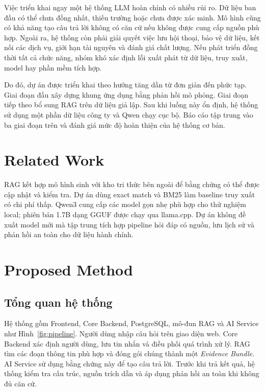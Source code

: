 \documentclass[runningheads]{llncs}
\begin{document}
Việc triển khai ngay một hệ thống LLM hoàn chỉnh có nhiều rủi ro. Dữ liệu ban đầu
có thể chưa đồng nhất, thiếu trường hoặc chưa được xác minh. Mô hình cũng có khả
năng tạo câu trả lời không có căn cứ nếu không được cung cấp nguồn phù hợp. Ngoài
ra, hệ thống còn phải giải quyết việc lưu hội thoại, bảo vệ dữ liệu, kết nối các
dịch vụ, giới hạn tài nguyên và đánh giá chất lượng. Nếu phát triển đồng thời tất
cả chức năng, nhóm khó xác định lỗi xuất phát từ dữ liệu, truy xuất, model hay
phần mềm tích hợp.

Do đó, dự án được triển khai theo hướng tăng dần từ đơn giản đến phức tạp. Giai
đoạn đầu xây dựng khung ứng dụng bằng phản hồi mô phỏng. Giai đoạn tiếp theo bổ
sung RAG trên dữ liệu giả lập. Sau khi luồng này ổn định, hệ thống sử dụng một
phần dữ liệu công ty và Qwen chạy cục bộ. Báo cáo tập trung vào ba giai đoạn trên
và đánh giá mức độ hoàn thiện của hệ thống cơ bản.

\section{Related Work}

RAG kết hợp mô hình sinh với kho tri thức bên ngoài để bằng chứng có thể được cập
nhật và kiểm tra. Dự án dùng exact match và BM25 làm baseline truy xuất có chi
phí thấp. Qwen3 cung cấp các model gọn nhẹ phù hợp cho thử nghiệm local; phiên
bản 1.7B dạng GGUF được chạy qua llama.cpp. Dự án không
đề xuất model mới mà tập trung tích hợp pipeline hỏi đáp có nguồn, lưu lịch sử và
phản hồi an toàn cho dữ liệu hành chính.

\section{Proposed Method}

\subsection{Tổng quan hệ thống}

Hệ thống gồm Frontend, Core Backend, PostgreSQL, mô-đun RAG và AI Service như
Hình~\ref{fig:pipeline}. Người dùng nhập câu hỏi trên giao diện web. Core Backend
xác định người dùng, lưu tin nhắn và điều phối quá trình xử lý. RAG tìm các đoạn
thông tin phù hợp và đóng gói chúng thành một \textit{Evidence Bundle}. AI Service
sử dụng bằng chứng này để tạo câu trả lời. Trước khi trả kết quả, hệ thống kiểm
tra cấu trúc, nguồn trích dẫn và áp dụng phản hồi an toàn khi không đủ căn cứ.
\end{document}
